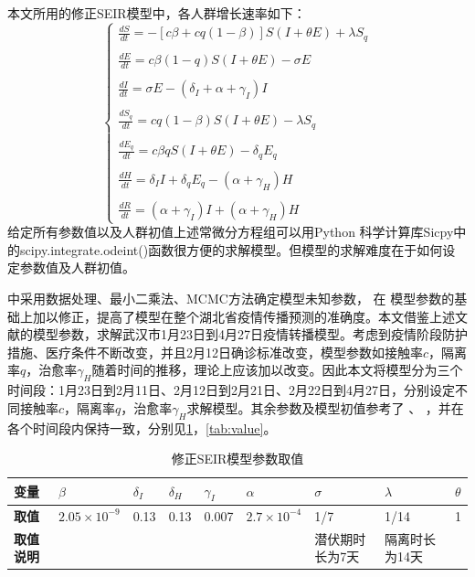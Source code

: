 \documentclass[withoutpre]{cumcmthesis} %
\begin{document}
本文所用的修正SEIR模型中，各人群增长速率如下：
\begin{equation}
    \left\{\begin{array}{l}
        \displaystyle \frac{d S}{d t}=-[  c \beta+  c q(1-\beta)] S(I+\theta E)+\lambda S_{q} \\ \\
        \displaystyle \frac{dE}{dt}=  c \beta(1-q) S(I+\theta E)-\sigma E \\ \\
        \displaystyle \frac{dI}{dt}=\sigma E-\left(\delta_{I}+\alpha+\gamma_{I}\right) I \\ \\
        \displaystyle \frac{dS_q}{dt} =  c q(1-\beta) S(I+\theta E)-\lambda S_{q} \\ \\
        \displaystyle \frac{dE_q}{dt}=  c \beta q S(I+\theta E)-\delta_{q} E_{q} \\ \\
        \displaystyle\frac{dH}{dt}=\delta_{I} I+\delta_{q} E_{q}-\left(\alpha+\gamma_{H}\right) H \\ \\
        \displaystyle\frac{dR}{dt}=(\alpha + \gamma_{I})I+(\alpha + \gamma_{H})H
        \end{array}\right.
    \label{equation:1}
\end{equation}
给定所有参数值以及人群初值上述常微分方程组可以用Python 科学计算库Sicpy中的scipy.integrate.odeint()函数很方便的求解模型。但模型的求解难度在于如何设定参数值及人群初值。

 \cite{reference1}中采用数据处理、最小二乘法、MCMC方法确定模型未知参数， \cite{reference2}在 \cite{reference1}模型参数的基础上加以修正，提高了模型在整个湖北省疫情传播预测的准确度。本文借鉴上述文献的模型参数，求解武汉市1月23日到4月27日疫情转播模型。考虑到疫情阶段防护措施、医疗条件不断改变，并且2月12日确诊标准改变，模型参数如接触率$c$，隔离率$q$，治愈率$\gamma_H$随着时间的推移，理论上应该加以改变。因此本文将模型分为三个时间段：1月23日到2月11日、2月12日到2月21日、2月22日到4月27日，分别设定不同接触率$c$，隔离率$q$，治愈率$\gamma_H$求解模型。其余参数及模型初值参考了 \cite{reference1}、 \cite{reference2}，并在各个时间段内保持一致，分别见\cref{tab:para}，\cref{tab:value}。

\begin{table}[H]\small
    \caption{修正SEIR模型参数取值}
    \label{tab:para} \centering
    \begin{tabular}{p{1.5cm}p{2cm}p{1cm}p{1cm}p{1cm}p{2cm}p{1.5cm}p{1.5cm}p{1cm}}
        \toprule[1.5pt]
        \textbf{变量} & $\beta$ & $\delta_I$ & $\delta_H$ & $\gamma_I$ & $\alpha$ & $\sigma $ & $\lambda$ &$\theta$\\
        \midrule[1pt]
        \textbf{取值} & $2.05 \times 10^{-9}$ & 0.13& 0.13& 0.007& $ 2.7 \times 10^{-4} $ & 1/7& 1/14&1\\
        \textbf{取值说明} &  \cite{reference2}&  \cite{reference1}&  \cite{reference1}&  \cite{reference2}&  \cite{reference2}&潜伏期时长为7天 & 隔离时长为14天& \cite{reference2}\\
        \bottomrule[1.5pt]
    \end{tabular}
\end{table}
\end{document}
